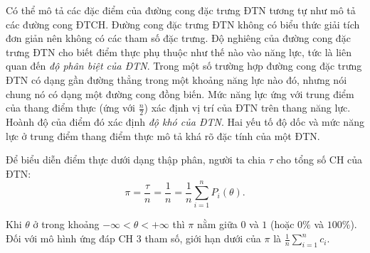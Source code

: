 Có thể mô tả các đặc điểm của đường cong đặc trưng ĐTN tương tự như mô tả các đường cong ĐTCH. Đường cong đặc trưng ĐTN không có biểu thức giải tích đơn giản nên không có các tham số đặc trưng. Độ nghiêng của đường cong đặc trưng ĐTN cho biết điểm thực phụ thuộc như thế nào vào năng lực, tức là liên quan đến \textit{độ phân biệt của ĐTN}. Trong một số trường hợp đường cong đặc trưng ĐTN có dạng gần đường thẳng trong một khoảng năng lực nào đó, nhưng nói chung nó có dạng một đường cong đồng biến. Mức năng lực ứng với trung điểm của thang điểm thực (ứng với $\frac n2$) xác định vị trí của ĐTN trên thang năng lực. Hoành độ của điểm đó xác định \textit{độ khó của ĐTN}. Hai yếu tố độ dốc và mức năng lực ở trung điểm thang điểm thực mô tả khá rõ đặc tính của một ĐTN.\par
Để biểu diễn điểm thực dưới dạng thập phân, người ta chia $\tau$ cho tổng số CH của ĐTN: $$\pi=\frac{\tau}{n}=\frac 1n=\frac 1n\sum_{i=1}^{n}P_i(\theta).$$\par
Khi $\theta$ ở trong khoảng $-\infty<\theta<+\infty$ thì $\pi$ nằm giữa $0$ và $1$ (hoặc $0\%$ và $100\%$). Đối với mô hình ứng đáp CH 3 tham số, giới hạn dưới của $\pi$ là $\frac 1n\sum_{i=1}^{n}c_i$.

